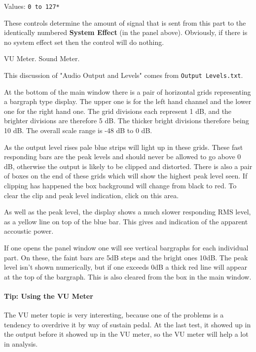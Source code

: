    Values: \texttt{0 to 127*}

   These controls determine the amount of signal that is sent from this part to
   the identically numbered \textbf{System Effect} (in the panel above).
   Obviously, if there is no system effect set then the control will do nothing.

   VU Meter.  Sound Meter.

   This discussion of "Audio Output and Levels"
   comes from \texttt{Output Levels.txt}.

   At the bottom of the main window there is a pair of horizontal grids
   representing a bargraph type display. The upper one is for the left hand
   channel and the lower one for the right hand one. The grid divisions each
   represent 1 dB, and the brighter divisions are therefore 5 dB. The thicker
   bright divisions therefore being 10 dB. The overall scale range is -48 dB to
   0 dB.

   As the output level rises pale blue strips will light up in these grids.
   These fast responding bars are the peak levels and should never be allowed
   to go above 0 dB, otherwise the output is likely to be clipped and distorted.
   There is also a pair of boxes on the end of these grids which will show the
   highest peak level seen. If clipping has happened the box background will
   change from black to red.
   To clear the clip and peak level indication, click on this area.

   As well as the peak level, the display shows a much slower responding RMS
   level, as a yellow line on top of the blue bar. This gives and indication of
   the apparent accoustic power.

   If one opens the panel window one will see vertical bargraphs for each
   individual part. On these, the faint bars are 5dB steps and the bright ones
   10dB. The peak level isn't shown numerically, but if one exceeds 0dB a thick
   red line will appear at the top of the bargraph. This is also cleared from
   the box in the main window.

\paragraph{Tip: Using the VU Meter}
\label{paragraph:tips_using_the_vu_meter}

   The VU meter topic is very interesting, because one of the problems
   is a tendency to overdrive it by way of sustain pedal.  At the last test, it
   showed up in the output before it showed up in the VU meter, so
   the VU meter will help a lot in analysis.

